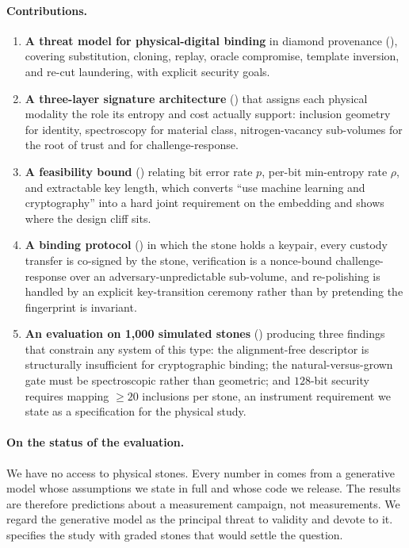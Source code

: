 \documentclass[10pt,twocolumn]{article}
\theoremstyle{remark}
\begin{document}
\paragraph{Contributions.}
\begin{enumerate}
\item \textbf{A threat model for physical-digital binding} in diamond
provenance (), covering substitution, cloning, replay, oracle
compromise, template inversion, and re-cut laundering, with explicit security
goals.

\item \textbf{A three-layer signature architecture} ()
that assigns each physical modality the role its entropy and cost actually
support: inclusion geometry for identity, spectroscopy for material class,
nitrogen-vacancy sub-volumes for the root of trust and for challenge-response.

\item \textbf{A feasibility bound} () relating bit error rate
$p$, per-bit min-entropy rate $\rho$, and extractable key length, which converts
``use machine learning and cryptography'' into a hard joint requirement on the
embedding and shows where the design cliff sits.

\item \textbf{A binding protocol} () in which the stone holds
a keypair, every custody transfer is co-signed by the stone, verification is a
nonce-bound challenge-response over an adversary-unpredictable sub-volume, and
re-polishing is handled by an explicit key-transition ceremony rather than by
pretending the fingerprint is invariant.

\item \textbf{An evaluation on 1{,}000 simulated stones} ()
producing three findings that constrain any system of this type: the
alignment-free descriptor is structurally insufficient for cryptographic
binding; the natural-versus-grown gate must be spectroscopic rather than
geometric; and $128$-bit security requires mapping $\geq 20$ inclusions per
stone, an instrument requirement we state as a specification for the physical
study.
\end{enumerate}

\paragraph{On the status of the evaluation.} We have no access to physical
stones. Every number in  comes from a generative model whose
assumptions we state in full and whose code we release. The results are
therefore predictions about a measurement campaign, not measurements. We regard
the generative model as the principal threat to validity and devote
 to it.  specifies the study with graded stones
that would settle the question.
\end{document}
